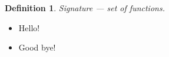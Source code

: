 \documentclass{article}
\newtheorem{definition}{Definition}
\begin{document}
\begin{definition}

  Signature --- set of functions.


\end{definition}


\begin{itemize}

  \item Hello!
  \item Good bye!

\end{itemize}
\end{document}
